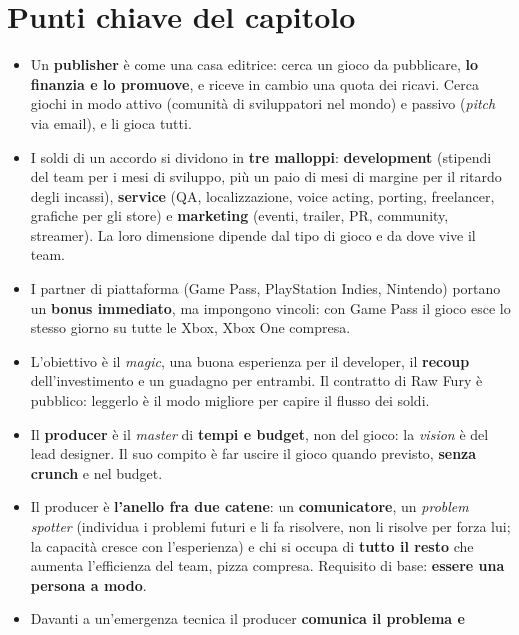 \section*{Punti chiave del capitolo}

\begin{itemize}
  \item Un \textbf{publisher} è come una casa editrice: cerca un gioco da
        pubblicare, \textbf{lo finanzia e lo promuove}, e riceve in cambio una
        quota dei ricavi. Cerca giochi in modo attivo (comunità di sviluppatori
        nel mondo) e passivo (\emph{pitch} via email), e li gioca tutti.
  \item I soldi di un accordo si dividono in \textbf{tre malloppi}:
        \textbf{development} (stipendi del team per i mesi di sviluppo, più un
        paio di mesi di margine per il ritardo degli incassi), \textbf{service}
        (QA, localizzazione, voice acting, porting, freelancer, grafiche per gli
        store) e \textbf{marketing} (eventi, trailer, PR, community, streamer).
        La loro dimensione dipende dal tipo di gioco e da dove vive il team.
  \item I partner di piattaforma (Game Pass, PlayStation Indies, Nintendo)
        portano un \textbf{bonus immediato}, ma impongono vincoli: con Game
        Pass il gioco esce lo stesso giorno su tutte le Xbox, Xbox One compresa.
  \item L'obiettivo è il \emph{magic}, una buona esperienza per il developer, il
        \textbf{recoup} dell'investimento e un guadagno per entrambi. Il
        contratto di Raw Fury è pubblico: leggerlo è il modo migliore per capire
        il flusso dei soldi.
  \item Il \textbf{producer} è il \emph{master} di \textbf{tempi e budget}, non
        del gioco: la \emph{vision} è del lead designer. Il suo compito è far
        uscire il gioco quando previsto, \textbf{senza crunch} e nel budget.
  \item Il producer è \textbf{l'anello fra due catene}: un
        \textbf{comunicatore}, un \emph{problem spotter} (individua i problemi
        futuri e li fa risolvere, non li risolve per forza lui; la capacità
        cresce con l'esperienza) e chi si occupa di \textbf{tutto il resto} che
        aumenta l'efficienza del team, pizza compresa. Requisito di base:
        \textbf{essere una persona a modo}.
  \item Davanti a un'emergenza tecnica il producer \textbf{comunica il problema e
}
\end{itemize}
